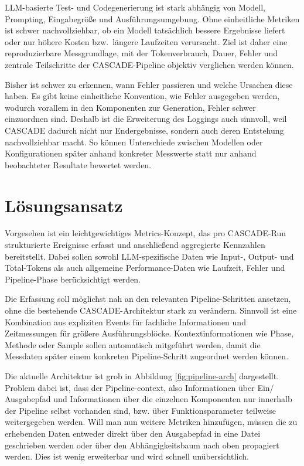 \documentclass[a4paper,12pt]{article}
\begin{document}
LLM-basierte Test- und Codegenerierung ist stark abhängig von
Modell, Prompting, Eingabegröße und Ausführungsumgebung.
Ohne einheitliche Metriken ist schwer nachvollziehbar,
ob ein Modell tatsächlich bessere Ergebnisse liefert
oder nur höhere Kosten bzw.\ längere Laufzeiten verursacht.
Ziel ist daher eine reproduzierbare Messgrundlage,
mit der Tokenverbrauch, Dauer, Fehler und zentrale Teilschritte
der CASCADE-Pipeline objektiv verglichen werden können.

Bisher ist schwer zu erkennen, wann Fehler passieren und welche Ursachen diese haben.
Es gibt keine einheitliche Konvention, wie Fehler ausgegeben werden,
wodurch vorallem in den Komponenten zur Generation,
Fehler schwer einzuordnen sind.
Deshalb ist die Erweiterung des Loggings auch sinnvoll,
weil CASCADE dadurch nicht nur Endergebnisse,
sondern auch deren Entstehung nachvollziehbar macht.
So können Unterschiede zwischen Modellen oder Konfigurationen
später anhand konkreter Messwerte statt nur anhand
beobachteter Resultate bewertet werden.

\section{Lösungsansatz}

Vorgesehen ist ein leichtgewichtiges Metrics-Konzept,
das pro CASCADE-Run strukturierte Ereignisse erfasst
und anschließend aggregierte Kennzahlen bereitstellt.
Dabei sollen sowohl LLM-spezifische Daten
wie Input-, Output- und Total-Tokens
als auch allgemeine Performance-Daten
wie Laufzeit, Fehler und Pipeline-Phase berücksichtigt werden.

Die Erfassung soll möglichst nah an den relevanten Pipeline-Schritten ansetzen,
ohne die bestehende CASCADE-Architektur stark zu verändern.
Sinnvoll ist eine Kombination aus expliziten Events
für fachliche Informationen
und Zeitmessungen für größere Ausführungsblöcke.
Kontextinformationen wie Phase, Methode oder Sample
sollen automatisch mitgeführt werden,
damit die Messdaten später einem konkreten Pipeline-Schritt
zugeordnet werden können.

Die aktuelle Architektur ist grob in Abbildung \ref{fig:pipeline-arch} dargestellt.
Problem dabei ist, dass der Pipeline-context, also Informationen über Ein/ Ausgabepfad und Informationen über die einzelnen Komponenten
nur innerhalb der Pipeline selbst vorhanden sind, bzw. über Funktionsparameter teilweise weitergegeben werden.
Will man nun weitere Metriken hinzufügen, müssen die zu erhebenden Daten entweder direkt über
den Ausgabepfad in eine Datei geschrieben werden oder über den
Abhängigkeitsbaum nach oben propagiert werden. Dies ist wenig erweiterbar und wird schnell unübersichtlich.
\end{document}
